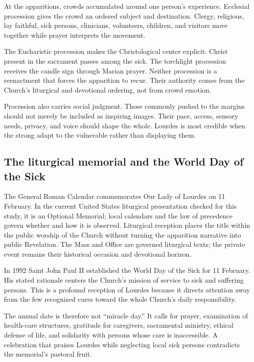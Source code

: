 At the apparitions, crowds accumulated around one person's experience. Ecclesial procession gives the crowd an ordered subject and destination. Clergy, religious, lay faithful, sick persons, clinicians, volunteers, children, and visitors move together while prayer interprets the movement.

The Eucharistic procession makes the Christological center explicit: Christ present in the sacrament passes among the sick. The torchlight procession receives the candle sign through Marian prayer. Neither procession is a reenactment that forces the apparition to recur. Their authority comes from the Church's liturgical and devotional ordering, not from crowd emotion.

Procession also carries social judgment. Those commonly pushed to the margins should not merely be included as inspiring images. Their pace, access, sensory needs, privacy, and voice should shape the whole. Lourdes is most credible when the strong adapt to the vulnerable rather than displaying them.

\subsection{The liturgical memorial and the World Day of the Sick}

The General Roman Calendar commemorates Our Lady of Lourdes on 11 February. In the current United States liturgical presentation checked for this study, it is an Optional Memorial; local calendars and the law of precedence govern whether and how it is observed. Liturgical reception places the title within the public worship of the Church without turning the apparition narrative into public Revelation. The Mass and Office are governed liturgical texts; the private event remains their historical occasion and devotional horizon.

In 1992 Saint John Paul II established the World Day of the Sick for 11 February. His stated rationale centers the Church's mission of service to sick and suffering persons. This is a profound reception of Lourdes because it directs attention away from the few recognized cures toward the whole Church's daily responsibility.

The annual date is therefore not “miracle day.” It calls for prayer, examination of health-care structures, gratitude for caregivers, sacramental ministry, ethical defense of life, and solidarity with persons whose care is inaccessible. A celebration that praises Lourdes while neglecting local sick persons contradicts the memorial's pastoral fruit.

